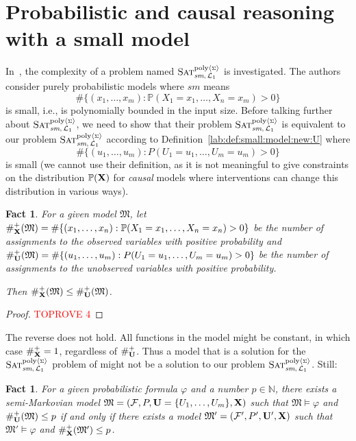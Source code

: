 \documentclass[a4paper,UKenglish,cleveref, autoref, thm-restate]{lipics-v2021}
\newtheorem{fact}[equation]{Fact}
\newcommand{\IN}{\mathbb{N}}
\newcommand{\compactEquals}[1]{\let\IsInPP=1#1\let\IsInPP=\relax}
\newcommand{\PP}[1]{\mathbb{P}(\compactEquals{#1})}
\newcommand{\cF}{{\mathcal F}}
\newcommand{\fM}{{\mathfrak M}}
\newcommand{\bU}{{\bf U}}
\newcommand{\bX}{{\bf X}}
\def\probsumname#1#2{^{\text{#1}{\langle{\scriptscriptstyle\Sigma}\rangle}}_{\text{#2}}}
\newcommand{\SATprobpolysumsm}{\mbox{\sc Sat}\probsumname{poly}{\textit{sm},\,${\cal L}_1$}}
\begin{document}
\section{Probabilistic and causal reasoning with a small model}\label{sec:etr:sum}
\label{sec:small}

In~\citep{blaser2024existential}, the complexity of a problem named $\SATprobpolysumsm$ is investigated. 
The authors consider purely probabilistic models where $sm$ means $$\#\{(x_1,\ldots,x_m): \mathbb{P}(X_1=x_1,\ldots, X_n=x_m) > 0\}$$ is small, i.e., is polynomially bounded in the input size. 
Before talking further about $\SATprobpolysumsm$, we need to show that their problem $\SATprobpolysumsm$ is equivalent to our problem $\SATprobpolysumsm$ according to Definition~\ref{lab:def:small:model:new:U} where $$\#\{(u_1,\ldots,u_m): P(U_1=u_1,\ldots, U_m=u_m) > 0\}$$ is small (we cannot use their definition, as it is not meaningful to give constraints on the distribution $\mathbb{P}(\bX)$ for \emph{causal} models where interventions can change this distribution in various ways).  

\newcommand{\countPosU}[1]{\#_\bU^+(#1)}
\newcommand{\countPosX}[1]{\#_\bX^+(#1)}

\begin{fact}\label{fact:small:model:observed:below:unobserved}
For a given model $\fM$, let $\countPosX{\fM} = \#\{(x_1,\ldots,x_n): \PP{X_1=x_1,\ldots, X_n=x_n} > 0\}$ be the number of assignments to the observed variables with positive probability and $\countPosU{\fM}= \#\{(u_1,\ldots,u_m): P(U_1=u_1,\ldots, U_m=u_m) > 0\}$ be the number of assignments to the unobserved variables with positive probability.

Then $\countPosX{\fM} \leq \countPosU{\fM}$.
\end{fact}
\begin{proof}\textcolor{red}{TOPROVE 4}\end{proof}
The reverse does not hold. All functions in the model might be constant, in which case $\#_\bX^+ = 1$, regardless of $\#_\bU^+$. 
Thus a model that is a solution for the $\SATprobpolysumsm$ problem of \citep{blaser2024existential} might not be a solution to our problem $\SATprobpolysumsm$.
Still:

\begin{fact}\label{fact:small:model:sat:observed:unobserved}
For a given probabilistic formula $\varphi$ and a number $p \in \IN$,
there exists a semi-Markovian model  $\fM=(\cF, P, \bU=\{U_1,\ldots,U_m\}, \bX)$ 
	such that $\fM \models\varphi$ and
$\countPosU{\fM} \le p$
    if and only if 
there exists a model  $\fM'=(\cF', P', \bU', \bX)$ 
	such that $\fM' \models\varphi$ and
    $\countPosX{\fM'} \le p$.
\end{fact}
\onlyFull{
\begin{proof}\textcolor{red}{TOPROVE 5}\end{proof}
}
\end{document}
